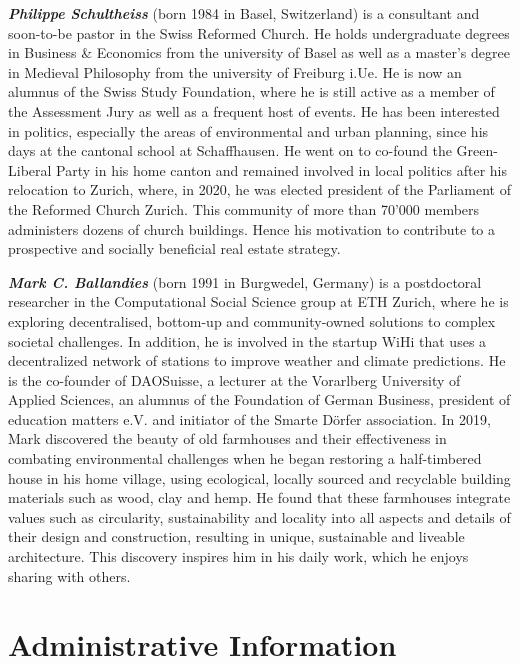 \documentclass{article}
\begin{document}
\textbf{\textit{Philippe Schultheiss}} (born 1984 in Basel, Switzerland) is a consultant and soon-to-be pastor in the Swiss Reformed Church. He holds undergraduate degrees in Business \& Economics from the university of Basel as well as a master's degree in Medieval Philosophy from the university of Freiburg i.Ue. He is now an alumnus of the Swiss Study Foundation, where he is still active as a member of the Assessment Jury as well as a frequent host of events. He has been interested in politics, especially the areas of environmental and urban planning, since his days at the cantonal school at Schaffhausen. He went on to co-found the Green-Liberal Party in his home canton and remained involved in local politics after his relocation to Zurich, where, in 2020, he was elected president of the Parliament of the Reformed Church Zurich. This community of more than 70'000 members administers dozens of church buildings. Hence his motivation to contribute to a prospective and socially beneficial real estate strategy.

\textbf{\textit{Mark C. Ballandies}} (born 1991 in Burgwedel, Germany) is a postdoctoral researcher in the Computational Social Science group at ETH Zurich, where he is exploring decentralised, bottom-up and community-owned solutions to complex societal challenges. In addition, he is involved in the startup WiHi that uses a decentralized network of stations to improve weather and climate predictions. He is the co-founder of DAOSuisse, a lecturer at the Vorarlberg University of Applied Sciences, an alumnus of the Foundation of German Business, president of education matters e.V. and initiator of the Smarte Dörfer association. In 2019, Mark discovered the beauty of old farmhouses and their effectiveness in combating environmental challenges when he began restoring a half-timbered house in his home village, using ecological, locally sourced and recyclable building materials such as wood, clay and hemp. He found that these farmhouses integrate values such as circularity, sustainability and locality into all aspects and details of their design and construction, resulting in unique, sustainable and liveable architecture. This discovery inspires him in his daily work, which he enjoys sharing with others.

\clearpage

\tableofcontents

\section*{\centering Administrative Information}
\end{document}
